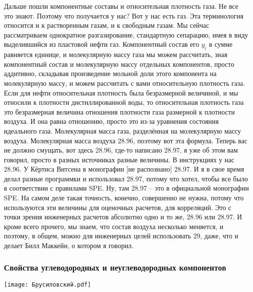 \documentclass[main.tex]{subfiles}
\begin{document}
Дальше пошли компонентные составы и относительная плотность газа.
Не все это знают.
Поэтому что получается у нас?
Вот у нас есть газ.
Эта терминология относится и к растворенным газам, и к свободным газам.
Мы сейчас рассматриваем однократное разгазирование, стандартную сепарацию, имея в виду выделившийся из пластовой нефти газ.
Компонентный состав его $y_i$ в сумме равняется единице, и молекулярную массу газа мы можем рассчитать, зная компонентный состав и молекулярную массу отдельных компонентов, просто аддитивно, складывая произведение мольной доли этого компонента на молекулярную массу, и можем рассчитать с вами относительную плотность газа.
Если для нефти относительная плотность была безразмерной величиной, и мы относили к плотности дистиллированной воды, то относительная плотность газа это безразмерная величина отношения плотности газа размерной к плотности воздуха.
И она равна отношению, просто это из-за уравнения состояния идеального газа.
Молекулярная масса газа, разделённая на молекулярную массу воздуха.
Молекулярная масса воздуха 28.96, поэтому вот эта формула.
Теперь вас не должно смущать, вот здесь 28.96, где-то написано 28.97, я уже об этом вам говорил, просто в разных источниках разные величины.
В инструкциях у нас 28.96.
У Кёртиса Витсена в монографии [не распознано] %
28.97.
И я в свое время делал разные программки и использовал 28.97, потому что хотел, чтобы все было в соответствии с правилами SPE.
Ну, там 28.97 -- это в официальной монографии SPE.
На самом деле такая точность, конечно, совершенно не нужна, потому что используются эти величины для оценочных расчетов, для корреляций.
Это с точки зрения инженерных расчетов абсолютно одно и то же, 28.96 или 28.97.
И кроме всего прочего, мы знаем, что состав воздуха несколько меняется, и поэтому, в общем, можно для инженерных целей использовать 29, даже, что и делает Билл Маккейн, о котором я говорил.

\subsubsection{Свойства углеводородных и неуглеводородных компонентов}

\begin{center}
\texttt{[image: Брусиловский.pdf]}
\end{center}
\end{document}
